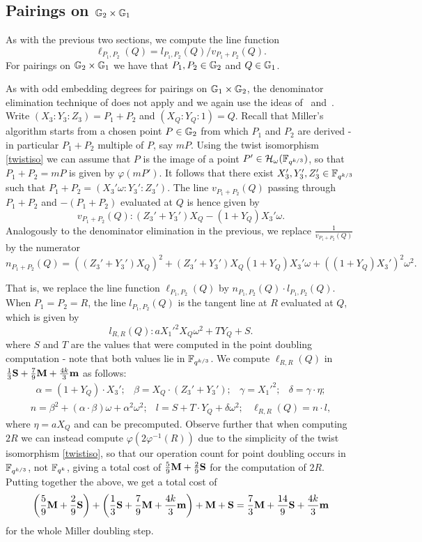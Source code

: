 \subsection{Pairings on $\mathbb{G}_{2} \times \mathbb{G}_{1}$}

As with the previous two sections, we compute the line function 
$$\ell_{P_1,P_2}(Q) = l_{P_1,P_2}(Q)/v_{P_1 + P_2}(Q).$$
For pairings on $\mathbb{G}_{2} \times \mathbb{G}_{1}$ we have that $P_1, P_2 \in \mathbb{G}_{2}$ and $Q \in \mathbb{G}_{1}$.

As with odd embedding degrees for pairings on $\mathbb{G}_{1} \times \mathbb{G}_{2}$, 
the denominator elimination technique of \cite{2010/Gu} does not apply
 and we again use the ideas of~\cite{2008/lin} and~\cite{2009/deg15}.
Write $(X_3:Y_3:Z_3) = P_1 + P_2$ and $(X_Q:Y_Q:1) = Q$. 
Recall that Miller's algorithm starts from a chosen point $P \in \mathbb{G}_{2}$
from which $P_1$ and $P_2$ are derived - in particular $P_1 + P_2$
multiple of $P$, say $mP$.
Using the twist isomorphism \eqref{twistiso} we can assume that
$P$ is the image of a point $P' \in \mathcal{H}_{\omega}(\mathbb{F}_{q^{k/3}})$,
so that $P_1 + P_2 = mP$ is given by $\varphi(mP')$.
It follows that there exist $X_3', Y_3',Z_3' \in \mathbb{F}_{q^{k/3}}$ such that
$P_1 + P_2 = (X_3'\omega : Y_3':Z_3')$. 
The line $v_{P_1+P_2}(Q)$ passing through $P_1+P_2$ and $-(P_1 + P_2)$ 
evaluated at $Q$
is hence given by
\[v_{P_1+P_2}(Q): 
(Z_3' + Y_3')X_Q - (1+Y_Q)X_3'\omega.\]
Analogously to the denominator elimination in the previous, we
replace $\frac{1}{v_{P_1+P_2}(Q)}$ by the numerator 
$$n_{P_1+P_2}(Q) = ((Z_3' + Y_3')X_Q)^2 
+ (Z_3' + Y_3')X_Q(1+Y_Q)X_3'\omega 
+ ((1+Y_Q)X_3')^2\omega^2.$$

That is, we replace the line function $\ell_{P_1,P_2}(Q)$ by $n_{P_1,P_2}(Q) \cdot l_{P_1,P_2}(Q)$.
When $P_1 = P_2 = R$, the line $l_{P_1,P_2}(Q)$ is the tangent line at $R$ evaluated at $Q$, which is given by
\[l_{R,R}(Q): aX_1'^2 X_Q \omega^2 + T Y_Q + S.\]
where $S$ and $T$ are the values that were computed in the point doubling computation - note that
both values lie in $\mathbb{F}_{q^{k/3}}$.
We compute $\ell_{R,R}(Q)$ in 
$\frac{1}{3}\textbf{S} + \frac{7}{9}\textbf{M} + \frac{4k}{3}\textbf{m} $ as follows:
\[\begin{array}{cccc}
\alpha = (1+Y_Q)\cdot X_3';&
 \beta = X_Q\cdot (Z_3' + Y_3'); &
 \gamma = X_1'^2; &
 \delta = \gamma\cdot\eta;
\end{array}\]
\[\begin{array}{ccc}
n = \beta^2 + (\alpha \cdot \beta) \omega + \alpha^2 \omega^2; &
l = S + T\cdot Y_Q + \delta\omega^2; &
\ell_{R,R}(Q) = n\cdot l,
\end{array}\]
where $\eta = aX_Q$ and can be precomputed.
Observe further that when computing $2R$ we can instead compute
$\varphi(2\varphi^{-1}(R))$ due to the simplicity of the twist isomorphism \eqref{twistiso},
so that our operation count for point doubling occurs in $\mathbb{F}_{q^{k/3}}$, not $\mathbb{F}_{q^k}$, giving a total cost of $\frac{5}{9}\textbf{M} + \frac{2}{9}\textbf{S}$ for the computation of $2R$.
Putting together the above, we get a total cost of 
\[\left(\frac{5}{9}\textbf{M} + \frac{2}{9}\textbf{S}\right) + \left(\frac{1}{3}\textbf{S} + \frac{7}{9}\textbf{M} + \frac{4k}{3}\textbf{m} \right) + \textbf{M} + \textbf{S} = \frac{7}{3}\textbf{M} + \frac{14}{9}\textbf{S} + \frac{4k}{3}\textbf{m}\]
for the whole Miller doubling step.

